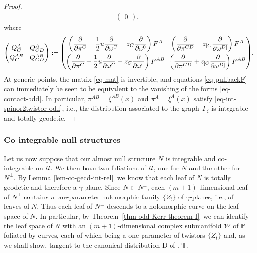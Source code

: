 \documentclass[pdftex]{sigma}
\numberwithin{equation}{section}
\newcommand{\parderv}[2] {\frac{\partial#1}{\partial#2}}
\newcommand{\mc} [1]{\mathcal{#1}}
\newcommand{\PT} {\mathbb{PT}}
\begin{document}
\begin{proof}
\begin{gather}
\begin{pmatrix}
0
\end{pmatrix} ,
\end{gather}
where
\begin{gather}\label{eq-mat}
\begin{pmatrix}
Q_C^A & Q_{CD}^A \vspace{1mm}\\
Q_C^{AB} & Q_{CD}^{AB}
\end{pmatrix} :=
\begin{pmatrix}
\displaystyle \left( \parderv{}{\pi^{C}} + \frac{1}{2} u \parderv{}{\omega^{C}} - z_{C} \parderv{}{\omega^0} \right) F^{A}\!\! & \displaystyle\left( \parderv{}{\pi^{CD}} + z_{[C} \parderv{}{\omega^{D]}} \right) F^{A} \vspace{1mm}\\
\displaystyle\left( \parderv{}{\pi^{C}} + \frac{1}{2} u \parderv{}{\omega^{C}} - z_{C} \parderv{}{\omega^0} \right) F^{AB}\!\! & \displaystyle\left( \parderv{}{\pi^{CD}} + z_{[C} \parderv{}{\omega^{D]}} \right) F^{AB}
\end{pmatrix}\! .\!\!
\end{gather}
At generic points, the matrix \eqref{eq-mat} is invertible, and equations \eqref{eq-pullbackF} can immediately be seen to be equivalent to the vanishing of the forms \eqref{eq-contact-odd}. In particular, $\pi^{AB} = \xi^{AB}(x)$ and \mbox{$\pi^{A} = \xi^A(x)$} satisfy \eqref{eq-int-spinor2twistor-odd}, i.e., the distribution associated to the graph~$\Gamma_{\xi}$ is integrable and totally geo\-detic.
\end{proof}

\subsubsection{Co-integrable null structures}
Let us now suppose that our almost null structure $N$ is integrable and co-integrable on $\mc{U}$. We then have two foliations of $\mc{U}$, one for $N$ and the other for $N^\perp$. By Lemma \ref{lem-co-geod-int-rel}, we know that each leaf of $N$ is totally geodetic and therefore a $\gamma$-plane. Since $N \subset N^\perp$, each $(m+1)$-dimensional leaf of $N^\perp$ contains a one-parameter holomorphic family $\{ \check{Z}_t \}$ of $\gamma$-planes, i.e., of leaves of $N$. Thus each leaf of $N^\perp$ descends to a holomorphic curve on the leaf space of $N$. In particular, by Theorem~\ref{thm-odd-Kerr-theorem-I}, we can identify the leaf space of $N$ with an $(m+1)$-dimensional complex submanifold $\mc{W}$ of $\PT$ foliated by curves, each of which being a one-parameter of twistors $\{ Z_t \}$ and, as we shall show, tangent to the canonical distribution $\mathrm{D}$ of $\PT$.
\end{document}
